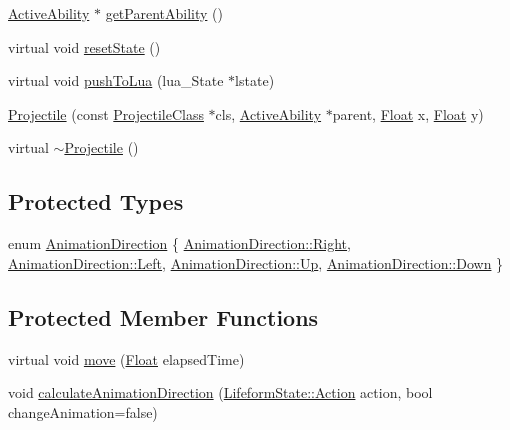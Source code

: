 \begin{DoxyCompactItemize}
\item 
\hyperlink{classZeta_1_1ActiveAbility}{Active\+Ability} $\ast$ \hyperlink{classZeta_1_1Projectile_a1e01ea4d15b0e693aa780e08ad64adc3}{get\+Parent\+Ability} ()
\item 
virtual void \hyperlink{classZeta_1_1Projectile_a3205782e632079d56a65ea165caa2932}{reset\+State} ()
\item 
virtual void \hyperlink{classZeta_1_1Projectile_aed223f728aa24c42953167f1b863fb77}{push\+To\+Lua} (lua\+\_\+\+State $\ast$lstate)
\item 
\hyperlink{classZeta_1_1Projectile_a15f8f3be24867d36b6f81cdccad86644}{Projectile} (const \hyperlink{classZeta_1_1ProjectileClass}{Projectile\+Class} $\ast$cls, \hyperlink{classZeta_1_1ActiveAbility}{Active\+Ability} $\ast$parent, \hyperlink{namespaceZeta_a1e0a1265f9b3bd3075fb0fabd39088ba}{Float} x, \hyperlink{namespaceZeta_a1e0a1265f9b3bd3075fb0fabd39088ba}{Float} y)
\item 
virtual \hyperlink{classZeta_1_1Projectile_a92cd7c083a8576938adcd72670d10507}{$\sim$\+Projectile} ()
\end{DoxyCompactItemize}
\subsection*{Protected Types}
\begin{DoxyCompactItemize}
\item 
enum \hyperlink{classZeta_1_1Projectile_a749ddf84f5e255f4c58d2fd37be8a566}{Animation\+Direction} \{ \hyperlink{classZeta_1_1Projectile_a749ddf84f5e255f4c58d2fd37be8a566a92b09c7c48c520c3c55e497875da437c}{Animation\+Direction\+::\+Right}, 
\hyperlink{classZeta_1_1Projectile_a749ddf84f5e255f4c58d2fd37be8a566a945d5e233cf7d6240f6b783b36a374ff}{Animation\+Direction\+::\+Left}, 
\hyperlink{classZeta_1_1Projectile_a749ddf84f5e255f4c58d2fd37be8a566a258f49887ef8d14ac268c92b02503aaa}{Animation\+Direction\+::\+Up}, 
\hyperlink{classZeta_1_1Projectile_a749ddf84f5e255f4c58d2fd37be8a566a08a38277b0309070706f6652eeae9a53}{Animation\+Direction\+::\+Down}
 \}
\end{DoxyCompactItemize}
\subsection*{Protected Member Functions}
\begin{DoxyCompactItemize}
\item 
virtual void \hyperlink{classZeta_1_1Projectile_a0d45fb8dac7385df02133b94ecfac5f5}{move} (\hyperlink{namespaceZeta_a1e0a1265f9b3bd3075fb0fabd39088ba}{Float} elapsed\+Time)
\item 
void \hyperlink{classZeta_1_1Projectile_acd286f924590421f7ac885dcd287c3cb}{calculate\+Animation\+Direction} (\hyperlink{classZeta_1_1LifeformState_a965add1b0f9a548c9f3f9147b34b4816}{Lifeform\+State\+::\+Action} action, bool change\+Animation=false)
\end{DoxyCompactItemize}
